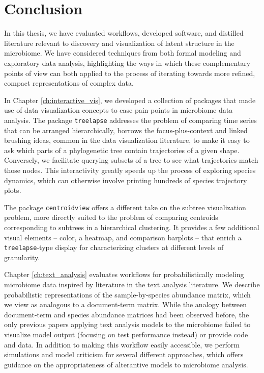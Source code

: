 \chapter{Conclusion}
\label{ch:conclusion}

In this thesis, we have evaluated workflows, developed software, and distilled
literature relevant to discovery and visualization of latent structure in the
microbiome. We have considered techniques from both formal modeling and
exploratory data analysis, highlighting the ways in which these complementary
points of view can both applied to the process of iterating towards more
refined, compact representations of complex data.

In Chapter \ref{ch:interactive_vis}, we developed a collection of packages that
made use of data visualization concepts to ease pain-points in microbiome data
analysis. The package \texttt{treelapse} addresses the problem of comparing time
series that can be arranged hierarchically, borrows the focus-plus-context and
linked brushing ideas, common in the data visualization literature, to make it
easy to ask which parts of a phylogenetic tree contain trajectories of a given
shape. Conversely, we facilitate querying subsets of a tree to see what
trajectories match those nodes. This interactivity greatly speeds up the process
of exploring species dynamics, which can otherwise involve printing hundreds of
species trajectory plots.

The package \texttt{centroidview} offers a different take on the subtree
visualization problem, more directly suited to the problem of comparing
centroids corresponding to subtrees in a hierarchical clustering. It provides a
few additional visual elements -- color, a heatmap, and comparison barplots --
that enrich a \texttt{treelapse}-type display for characterizing clusters at
different levels of granularity.

Chapter \ref{ch:text_analysis} evaluates workflows for probabilistically
modeling microbiome data inspired by literature in the text analysis literature.
We describe probabilistic representations of the sample-by-species abundance
matrix, which we view as analogous to a document-term matrix. While the analogy
between document-term and species abundance matrices had been observed before,
the only previous papers applying text analysis models to the microbiome failed
to visualize model output (focusing on test performance instead) or provide code
and data. In addition to making this workflow easily accessible, we perform
simulations and model criticism for several different approaches, which offers
guidance on the appropriateness of alterantive models to microbiome analysis.

